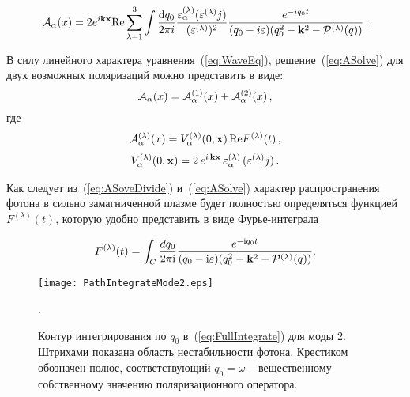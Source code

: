\begin{equation}\label{eq:ASolve}
	{\cal A}_\alpha(x) = 2 e^{i \mathbf{kx}} \mathrm{Re} \sum_{\lambda=1}^3 \int\frac{\mathrm{d} q_0}{2\pi i}\frac{\varepsilon_\alpha^{(\lambda)}(\varepsilon^{(\lambda)} j)}{(\varepsilon^{(\lambda)})^2}\frac{e^{-i q_0 t}}{(q_0-i\varepsilon)(q_0^2-\mathbf{k}^2-{\cal P}^{(\lambda)}(q))}\, .
\end{equation}

В силу линейного характера уравнения~(\ref{eq:WaveEq}), решение~(\ref{eq:ASolve}) для двух возможных поляризаций можно представить в виде:
\begin{equation}\label{eq:ASoveDivide}
	{\cal A}_\alpha(x)={\cal A}^{(1)}_\alpha(x)+{\cal A}^{(2)}_\alpha(x)\, ,
\end{equation}
где 
%
\begin{eqnarray}                        		
{\cal A}^{(\lambda)}_{\alpha} (x) = V^{(\lambda)}_\alpha (0, {\bf x}) \, \text{Re} F^{(\lambda)} (t) \, ,
\label{eq:V}
\end{eqnarray}
\begin{eqnarray}
V^{(\lambda)}_\alpha (0, {\bf x}) = 2\, e^{ i\, {\bf k x}} \, 
\varepsilon^{(\lambda)}_\alpha \, (\varepsilon^{(\lambda)} j)\, .
\label{eq:partialV}
\end{eqnarray}
%

Как следует из~(\ref{eq:ASoveDivide}) и~(\ref{eq:ASolve}) характер распространения фотона в сильно замагниченной плазме будет полностью определяться функцией $F^{(\lambda)} (t)$, которую удобно представить в виде Фурье-интеграла

\begin{equation}\label{eq:FullIntegrate}
	F^{(\lambda)}(t)=\int_C\frac{dq_0}{2\pi \mathrm{i}}\frac{e^{-\mathrm{i} q_0 t}}{(q_0-\mathrm{i} \varepsilon)(q_0^2-\mathbf{k}^2-{\cal P}^{(\lambda)}(q))}.
\end{equation}

	\begin{figure}[t]\centering
		\texttt{[image: PathIntegrateMode2.eps]}
		\caption{Контур интегрирования по $q_0$ в~(\ref{eq:FullIntegrate}) для моды 2. Штрихами показана область нестабильности фотона. Крестиком обозначен полюс, соответствующий $q_0=\omega$ -- вещественному собственному значению поляризационного оператора.}\label{fig:FullPathIntegr}.
	\end{figure}


